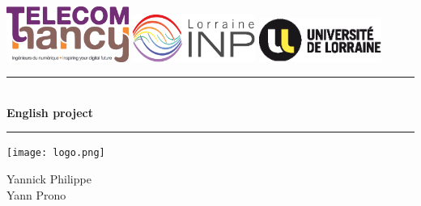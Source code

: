\thispagestyle{empty}

{\color{primary}


\includegraphics[width=4.0cm]{img/school-logo.eps}
\hspace{9mm}
\includegraphics[width=4.0cm]{img/collegium-logo.eps}
\hspace{5mm}
\includegraphics[width=4.0cm]{img/university-logo.eps}

\vspace{0.5cm}

	\begin{center}


			{\color[rgb]{0.8,0.8,.8}\rule{\textwidth}{0.8pt}}
			\vspace{0.5cm}

			\baselineskip=3pt
			{\Huge \bfseries{\appName}}\\
			\vspace{0.2cm}
			{\huge \bfseries{English project}}
			\vspace{0.5cm}

		{\color[rgb]{0.8,0.8,.8}\rule{\textwidth}{0.8pt}}
		\vspace{0.5cm}


		\texttt{[image: logo.png]}

		\Large{Yannick Philippe}\\
		\Large{Yann Prono}

		\vspace{1.5cm}
		\large{\schoolYear}
	\end{center}

}
